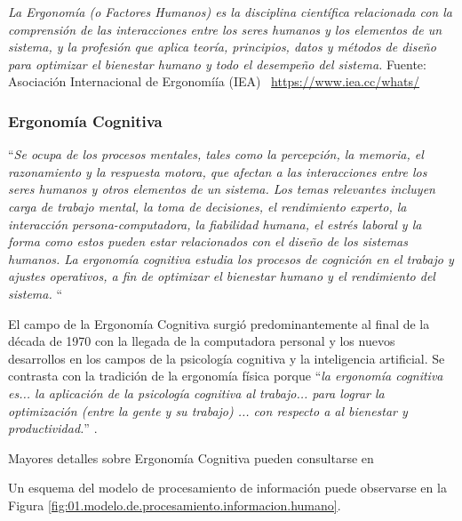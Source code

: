 \emph{La Ergonom\'ia (o Factores Humanos) es la disciplina cient\'ifica relacionada con la comprensi\'on de las in\-te\-rac\-cio\-nes entre los seres humanos y los elementos de un sistema, y la profesi\'on que aplica teor\'ia, principios, datos y m\'etodos de dise\~no para optimizar el bienestar humano y todo el desempe\~no del sistema.
}
{\tiny Fuente: Asociaci\'on Internacional de Ergonom\'iía (IEA) \,
\url{https://www.iea.cc/whats/}}


\subsubsection{Ergonom\'ia Cognitiva}
\label{sec:01.ergonomia.cognitiva}

\begin{tcolorbox}
  ``{\it Se ocupa de los procesos mentales, tales como la
    percepci\'on, la memoria, el razonamiento y la respuesta motora,
    que afectan a las interacciones entre los seres humanos y otros
    elementos de un sistema. Los temas relevantes incluyen carga de
    trabajo mental, la toma de decisiones, el rendimiento experto, la
    interacci\'on persona-computadora, la fiabilidad humana, el
    estr\'es laboral y la forma como estos pueden estar relacionados
    con el dise\~no de los sistemas humanos. La ergonom\'ia cognitiva
    estudia los procesos de cognición en el trabajo y ajustes
    operativos, a fin de optimizar el bienestar humano y el
    rendimiento del sistema. } `` \cite{Asociacion_int_ergonomia}
\end{tcolorbox}

El campo de la Ergonom\'ia Cognitiva surgi\'o predominantemente al final de la d\'ecada de 1970 con la llegada de la computadora personal y los nuevos desarrollos en los campos de la psicolog\'ia cognitiva y la inteligencia artificial. Se contrasta con la tradici\'on de la ergonom\'ia f\'isica porque ``\emph{la ergonom\'ia cognitiva es... la aplicaci\'on de la psicolog\'ia cognitiva al trabajo... para lograr la optimizaci\'on (entre la gente y su trabajo) ... con respecto a al bienestar y productividad.}'' \cite{ergonomia_cognitiva_long_john}.

\begin{tcolorbox}
  Mayores detalles sobre Ergonom\'ia Cognitiva pueden consultarse en \cite{van_der_Veer} 
\end{tcolorbox}

Un esquema del modelo de procesamiento de informaci\'on puede observarse en la Figura \ref{fig:01.modelo.de.procesamiento.informacion.humano}.

